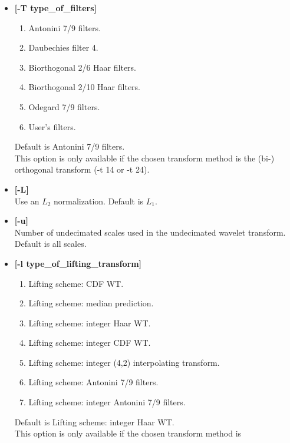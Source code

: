 \begin{itemize}
{\begin{enumerate}
\item Undecimated (bi-) orthogonal wavelet transform. \\
Antonini 7/9 filters ~\cite{wave:antonini92} are used by default, with an 
$L_1$ normalization. The filters can be changed using the ``-T'' option, and
an $L_2$ normalization is obtained by ``-L'' option.
\item Wavelet transform via lifting scheme 
\end{enumerate}}
Default is 2.
\item {\bf [-T type\_of\_filters]}  
{\small
\begin{enumerate}
\item Antonini 7/9 filters. 
\item Daubechies filter 4. 
\item Biorthogonal 2/6 Haar filters.
\item Biorthogonal 2/10 Haar filters.
\item Odegard 7/9 filters.
\item User's filters.
\end{enumerate}}
Default is Antonini 7/9 filters. \\
 This option is only available if the chosen transform method is
 the (bi-) orthogonal transform (-t 14 or -t 24).
\item {\bf [-L]} \\
Use an $L_2$ normalization. Default is $L_1$.
\item {\bf [-u]} \\
Number of undecimated scales used in the undecimated wavelet transform.
Default is all scales.
\item {\bf [-l type\_of\_lifting\_transform]}  
{\small 
\begin{enumerate}
\baselineskip=0.4truecm
\item Lifting scheme: CDF WT. 
\item Lifting scheme: median prediction.
\item Lifting scheme: integer Haar WT. 
\item Lifting scheme: integer CDF WT. 
\item Lifting scheme: integer (4,2) interpolating transform. 
\item Lifting scheme:  Antonini 7/9 filters.
\item Lifting scheme: integer Antonini 7/9 filters. 
\end{enumerate}}
 Default is Lifting scheme: integer Haar WT. \\
 This option is only available if the chosen transform method is

\end{itemize}
